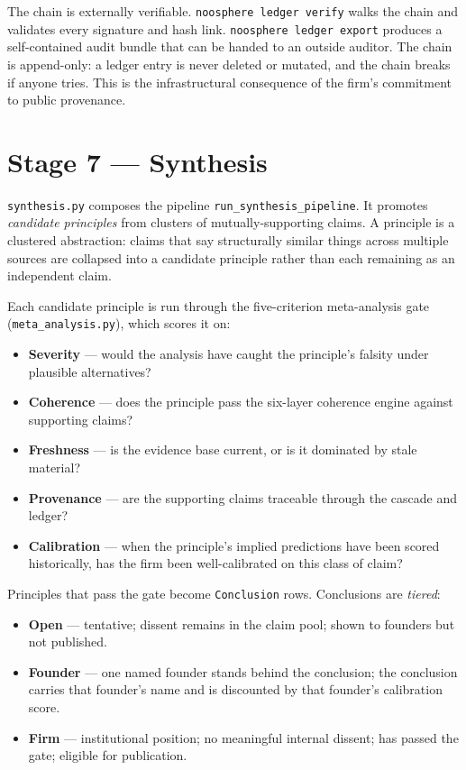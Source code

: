 \documentclass[11pt,letterpaper]{article}
\newcommand{\file}[1]{\texttt{#1}}
\begin{document}
The chain is externally verifiable. \texttt{noosphere ledger verify} walks the chain and validates every signature and hash link. \texttt{noosphere ledger export} produces a self-contained audit bundle that can be handed to an outside auditor. The chain is append-only: a ledger entry is never deleted or mutated, and the chain breaks if anyone tries. This is the infrastructural consequence of the firm's commitment to public provenance.

\section{Stage 7 --- Synthesis}

\file{synthesis.py} composes the pipeline \texttt{run\_synthesis\_pipeline}. It promotes \emph{candidate principles} from clusters of mutually-supporting claims. A principle is a clustered abstraction: claims that say structurally similar things across multiple sources are collapsed into a candidate principle rather than each remaining as an independent claim.

Each candidate principle is run through the five-criterion meta-analysis gate (\file{meta\_analysis.py}), which scores it on:

\begin{itemize}[leftmargin=1.5em,itemsep=0.1em]
\item \textbf{Severity} --- would the analysis have caught the principle's falsity under plausible alternatives?
\item \textbf{Coherence} --- does the principle pass the six-layer coherence engine against supporting claims?
\item \textbf{Freshness} --- is the evidence base current, or is it dominated by stale material?
\item \textbf{Provenance} --- are the supporting claims traceable through the cascade and ledger?
\item \textbf{Calibration} --- when the principle's implied predictions have been scored historically, has the firm been well-calibrated on this class of claim?
\end{itemize}

Principles that pass the gate become \texttt{Conclusion} rows. Conclusions are \emph{tiered}:

\begin{itemize}[leftmargin=1.5em,itemsep=0.1em]
\item \textbf{Open} --- tentative; dissent remains in the claim pool; shown to founders but not published.
\item \textbf{Founder} --- one named founder stands behind the conclusion; the conclusion carries that founder's name and is discounted by that founder's calibration score.
\item \textbf{Firm} --- institutional position; no meaningful internal dissent; has passed the gate; eligible for publication.
\end{itemize}
\end{document}
